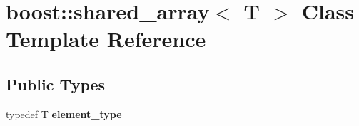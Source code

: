 \hypertarget{classboost_1_1shared__array}{\section{boost\+:\+:shared\+\_\+array$<$ T $>$ Class Template Reference}
\label{classboost_1_1shared__array}
}
\subsection*{Public Types}
\begin{DoxyCompactItemize}
\item 
\hypertarget{classboost_1_1shared__array_a0a0005a2b0873e3a1d519c55c7c34765}{typedef T {\bfseries element\+\_\+type}}\label{classboost_1_1shared__array_a0a0005a2b0873e3a1d519c55c7c34765}

\end{DoxyCompactItemize}
